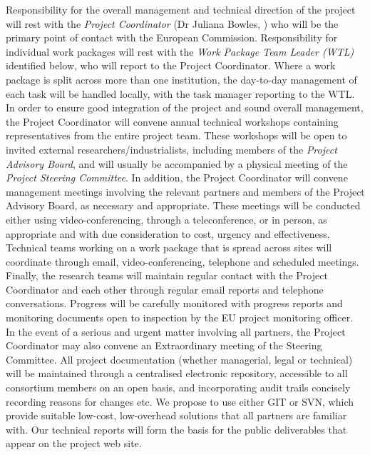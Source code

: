 \documentclass[a4paper,11pt]{article}
\begin{document}
Responsibility for the overall management and technical
direction of the project will rest with the \emph{Project Coordinator}
(Dr Juliana Bowles, \SA{}) who will be the primary point of
contact with the European Commission. Responsibility for
individual work packages will rest with the \emph{Work Package Team
Leader (WTL)} identified below, who will report to the Project Coordinator.
Where a work package is split across more than one
institution, the day-to-day management of each task will be handled
locally, with the task manager reporting to the WTL.   
%
In order to ensure good integration of the project and sound
overall management, the Project Coordinator will convene
annual technical workshops containing representatives from
the entire project team.   These workshops will be open to
invited external researchers/industrialists, including members
of the \emph{Project Advisory Board}, and will usually be
accompanied by a physical meeting of the \emph{Project Steering Committee}. In
addition, the Project Coordinator will convene management
meetings involving the relevant partners and members of the
Project Advisory Board, as necessary and appropriate. These meetings will be
conducted either using video-conferencing, through a
teleconference, or in person, as appropriate and with due consideration to
cost, urgency and effectiveness.  Technical teams
working on a work package that is spread across sites will
coordinate through email, video-conferencing, telephone and
scheduled meetings.  Finally, the research teams will maintain
regular contact with the Project Coordinator and each other
through regular email reports and telephone conversations.
Progress will be carefully monitored with progress reports and
monitoring documents open to inspection by the EU project
monitoring officer. In the event of a serious and urgent matter
involving all partners, the Project Coordinator may also
convene an Extraordinary meeting of the Steering Committee.
%
All project documentation (whether managerial, legal or
technical) will be maintained through a centralised electronic
repository, accessible to all consortium members on an open
basis, and incorporating audit trails concisely recording
reasons for changes etc.  We propose to use either GIT or SVN,
which provide suitable low-cost,  low-overhead solutions that all partners are
familiar with.  Our technical reports will form the basis for
the public deliverables that appear on the project web site.
\end{document}
